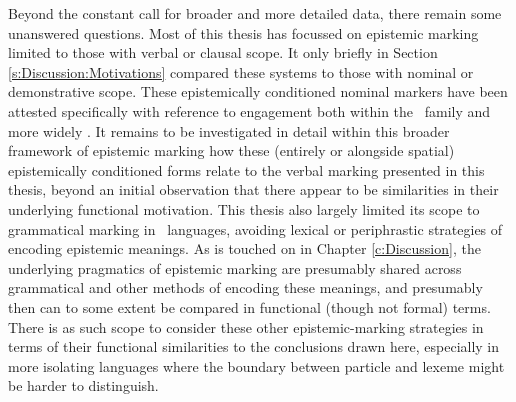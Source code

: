 Beyond the constant call for broader and more detailed data, there remain some unanswered questions. Most of this thesis has focussed on epistemic marking limited to those with verbal or clausal scope. It only briefly in Section \ref{s:Discussion:Motivations} compared these systems to those with nominal or demonstrative scope. These epistemically conditioned nominal markers have been attested specifically with reference to engagement both within the \lfam\ family \cite{GonzalezPerez2022} and more widely \cites{EvansBergqvistSanRoque2018a}{EvansBergqvistSanRoque2018b}. It remains to be investigated in detail within this broader framework of epistemic marking how these (entirely or alongside spatial) epistemically conditioned forms relate to the verbal marking presented in this thesis, beyond an initial observation that there appear to be similarities in their underlying functional motivation. This thesis also largely limited its scope to grammatical marking in \lfam\ languages, avoiding lexical or periphrastic strategies of encoding epistemic meanings. As is touched on in Chapter \ref{c:Discussion}, the underlying pragmatics of epistemic marking are presumably shared across grammatical and other methods of encoding these meanings, and presumably then can to some extent be compared in functional (though not formal) terms. There is as such scope to consider these other epistemic-marking strategies in terms of their functional similarities to the conclusions drawn here, especially in more isolating languages where the boundary between particle and lexeme might be harder to distinguish.